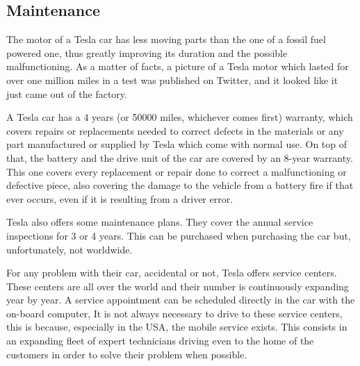\subsection{Maintenance}

The motor of a Tesla car has less moving parts than the one of a fossil fuel powered one, thus greatly improving its duration and the possible malfunctioning. As a matter of facts, a picture of a Tesla motor which lasted for over one million miles in a test was published on Twitter, and it looked like it just came out of the factory\cite{tesla1mMiles}.

A Tesla car has a 4 years (or 50000 miles, whichever comes first) warranty, which covers repairs or replacements needed to correct defects in the materials or any part manufactured or supplied by Tesla which come with normal use. On top of that, the battery and the drive unit of the car are covered by an 8-year warranty. This one covers every replacement or repair done to correct a malfunctioning or defective piece, also covering the damage to the vehicle from a battery fire if that ever occurs, even if it is resulting from a driver error\cite{teslaWarranty}. 

Tesla also offers some maintenance plans. They cover the annual service inspections for 3 or 4 years. This can be purchased when purchasing the car but, unfortunately, not worldwide. 

For any problem with their car, accidental or not, Tesla offers service centers. These centers are all over the world and their number is continuously expanding year by year. A service appointment can be scheduled directly in the car with the on-board computer, It is not always necessary to drive to these service centers, this is because, especially in the USA, the mobile service exists. This consists in an expanding fleet of expert technicians driving even to the home of the customers in order to solve their problem when possible.
